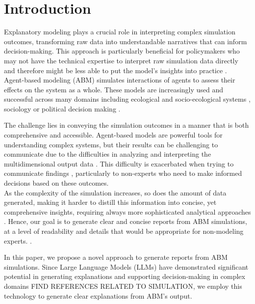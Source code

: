 \documentclass[preprint,12pt]{elsarticle}
\begin{document}

\section{Introduction}
\label{sec1}

Explanatory modeling plays a crucial role in interpreting complex simulation outcomes, transforming raw data into understandable narratives that can inform decision-making. This approach is particularly beneficial for policymakers who may not have the technical expertise to interpret raw simulation data directly and therefore might be less able to put the model's insights into practice \cite{Zellner2022}.\\

Agent-based modeling (ABM) simulates interactions of agents to assess their effects on the system as a whole. These models are increasingly used and successful across many domains including ecological and socio-ecological systems \cite{Achter2024} \cite{DeAngelis2019}, sociology \cite{Bianchi2015} or political decision making \cite{Qiu2020}.


 The challenge lies in conveying the simulation outcomes in a manner that is both comprehensive and accessible. Agent-based models are powerful tools for understanding complex systems, but their results can be challenging to communicate due to the difficulties in analyzing and interpreting the multidimensional output data \cite{Lee2015}. This difficulty is exacerbated when trying to communicate findings \cite{An2020}, particularly to non-experts who need to make informed decisions based on these outcomes.\cite{Papadopoulou2018}\\

As the complexity of the simulation increases, so does the amount of data generated, making it harder to distill this information into concise, yet comprehensive insights, requiring always more sophisticated analytical approaches \cite{Lee2015}. Hence, our goal is to generate clear and concise reports from ABM simulations, at a level of readability and details that would be appropriate for non-modeling experts. \cite{Sun2016}.

In this paper, we propose a novel approach to generate reports from ABM simulations. Since Large Language Models (LLMs) have demonstrated significant potential in generating explanations and supporting decision-making in complex domains FIND REFERENCES RELATED TO SIMULATION, we employ this technology to generate clear explanations from ABM's output. \\
\end{document}
